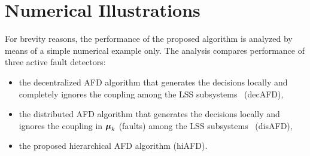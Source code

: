 \documentclass[conference,letterpaper]{IEEEtran}
\begin{document}
\section{Numerical Illustrations}\label{sec:numerical_illustration}
For brevity reasons, the performance of the proposed algorithm is analyzed by means of a simple numerical example only. 
The analysis compares performance of three active fault detectors:
\begin{itemize}
  \item the decentralized AFD algorithm that generates the decisions locally and completely ignores the coupling among the LSS subsystems~\cite{Straka2019:cp:FUSION} (decAFD),
  \item the distributed AFD algorithm that generates the decisions locally and ignores the coupling in $\boldsymbol{\mu}_k$ (faults) among the LSS subsystems~\cite{Straka2019:cp:FUSION} (disAFD),
  \item the proposed hierarchical AFD algorithm (hiAFD).
\end{itemize}
\end{document}
